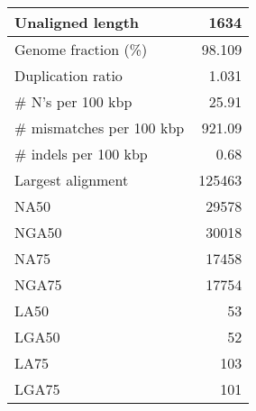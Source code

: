 \documentclass[12pt,a4paper]{article}
\begin{document}
\begin{table}[ht]
\begin{center}
\begin{tabular}{|l*{1}{|r}|}
Unaligned length & 1634 \\ \hline
Genome fraction (\%) & 98.109 \\ \hline
Duplication ratio & 1.031 \\ \hline
\# N's per 100 kbp & 25.91 \\ \hline
\# mismatches per 100 kbp & 921.09 \\ \hline
\# indels per 100 kbp & 0.68 \\ \hline
Largest alignment & 125463 \\ \hline
NA50 & 29578 \\ \hline
NGA50 & 30018 \\ \hline
NA75 & 17458 \\ \hline
NGA75 & 17754 \\ \hline
LA50 & 53 \\ \hline
LGA50 & 52 \\ \hline
LA75 & 103 \\ \hline
LGA75 & 101 \\ \hline
\end{tabular}
\end{center}
\end{table}
\end{document}
